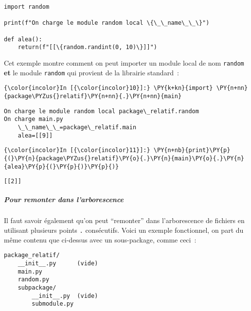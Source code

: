     \begin{Verbatim}[commandchars=\\\{\}]
import random

print(f"On charge le module random local \{\_\_name\_\_\}")

def alea():
    return(f"[[\{random.randint(0, 10)\}]]")

    \end{Verbatim}

    Cet exemple montre comment on peut importer un module local de nom
\texttt{random} \textbf{et} le module \texttt{random} qui provient de la
librairie standard~:

    \begin{Verbatim}[commandchars=\\\{\}]
{\color{incolor}In [{\color{incolor}10}]:} \PY{k+kn}{import} \PY{n+nn}{package\PYZus{}relatif}\PY{n+nn}{.}\PY{n+nn}{main}
\end{Verbatim}


    \begin{Verbatim}[commandchars=\\\{\}]
On charge le module random local package\_relatif.random
On charge main.py
    \_\_name\_\_=package\_relatif.main
    alea=[[9]]

    \end{Verbatim}

    \begin{Verbatim}[commandchars=\\\{\}]
{\color{incolor}In [{\color{incolor}11}]:} \PY{n+nb}{print}\PY{p}{(}\PY{n}{package\PYZus{}relatif}\PY{o}{.}\PY{n}{main}\PY{o}{.}\PY{n}{alea}\PY{p}{(}\PY{p}{)}\PY{p}{)}
\end{Verbatim}


    \begin{Verbatim}[commandchars=\\\{\}]
[[2]]

    \end{Verbatim}

    \hypertarget{pour-remonter-dans-larborescence}{%
\subparagraph{Pour remonter dans
l'arborescence}\label{pour-remonter-dans-larborescence}}

    Il faut savoir également qu'on peut ``remonter'' dans l'arborescence de
fichiers en utilisant plusieurs points \texttt{.} consécutifs. Voici un
exemple fonctionnel, on part du même contenu que ci-dessus avec un
sous-package, comme ceci~:

    \begin{verbatim}
package_relatif/
    __init__.py      (vide)
    main.py
    random.py
    subpackage/
        __init__.py  (vide)
        submodule.py
\end{verbatim}

